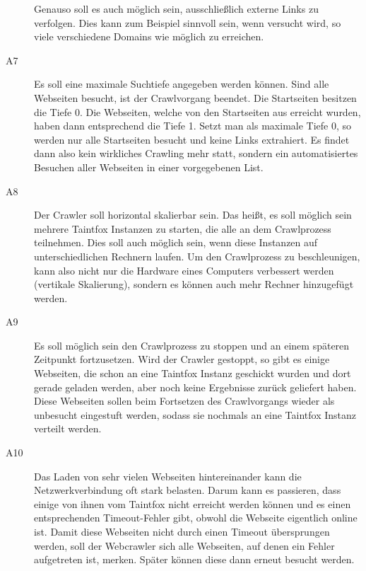 \begin{description}
	Genauso soll es auch möglich sein, ausschließlich externe Links zu verfolgen. Dies kann zum Beispiel sinnvoll sein, wenn versucht wird, so viele verschiedene Domains wie möglich zu erreichen.
	\item[ A7 ] Es soll eine maximale Suchtiefe angegeben werden können. Sind alle Webseiten besucht, ist der Crawlvorgang beendet. Die Startseiten besitzen die Tiefe 0. Die Webseiten, welche von den Startseiten aus erreicht wurden, haben dann entsprechend die Tiefe 1. Setzt man als maximale Tiefe 0, so werden nur alle Startseiten besucht und keine Links extrahiert. Es findet dann also kein wirkliches Crawling mehr statt, sondern ein automatisiertes Besuchen aller Webseiten in einer vorgegebenen List.
	\item[ A8 ] Der Crawler soll horizontal skalierbar sein. Das heißt, es soll möglich sein mehrere Taintfox Instanzen zu starten, die alle an dem Crawlprozess teilnehmen. Dies soll auch möglich sein, wenn diese Instanzen auf unterschiedlichen Rechnern laufen. Um den Crawlprozess zu beschleunigen, kann also nicht nur die Hardware eines Computers verbessert werden (vertikale Skalierung), sondern es können auch mehr Rechner hinzugefügt werden.
	\item[ A9 ] Es soll möglich sein den Crawlprozess zu stoppen und an einem späteren Zeitpunkt fortzusetzen. Wird der Crawler gestoppt, so gibt es einige Webseiten, die schon an eine Taintfox Instanz geschickt wurden und dort gerade geladen werden, aber noch keine Ergebnisse zurück geliefert haben. Diese Webseiten sollen beim Fortsetzen des Crawlvorgangs wieder als unbesucht eingestuft werden, sodass sie nochmals an eine Taintfox Instanz verteilt werden.
	\item[A10] Das Laden von sehr vielen Webseiten hintereinander kann die Netzwerkverbindung oft stark belasten. Darum kann es passieren, dass einige von ihnen vom Taintfox nicht erreicht werden können und es einen entsprechenden Timeout-Fehler gibt, obwohl die Webseite eigentlich online ist. Damit diese Webseiten nicht durch einen Timeout übersprungen werden, soll der Webcrawler sich alle Webseiten, auf denen ein Fehler aufgetreten ist, merken. Später können diese dann erneut besucht werden.  
\end{description}


